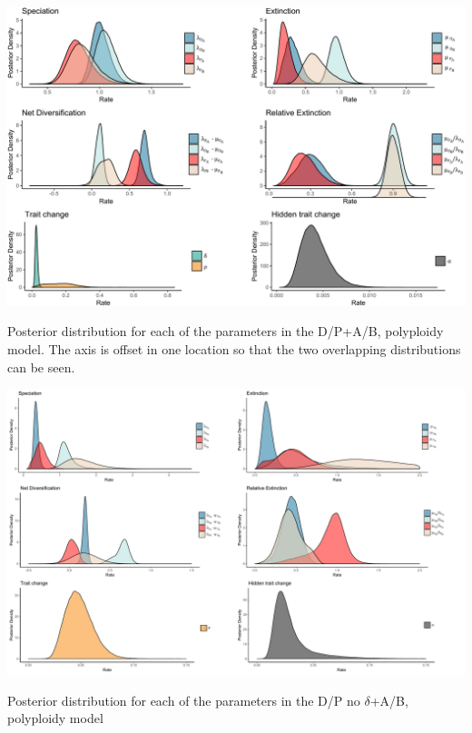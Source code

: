 \begin{suppfigure}
\includegraphics[width=\textwidth]{hisseDPposteriordist.pdf}
\caption{Posterior distribution for each of the parameters in the D/P+A/B, polyploidy model.  The axis is offset in one location so that the two overlapping distributions can be seen.} %
\label{suppfigure:DPAB}
\end{suppfigure}

\begin{suppfigure}
\includegraphics[width=\textwidth]{hisseDPnodipposteriordist.pdf}
\caption{Posterior distribution for each of the parameters in the D/P no $\delta$+A/B, polyploidy model} %
\label{suppfigure:DPnodipAB}
\end{suppfigure}

